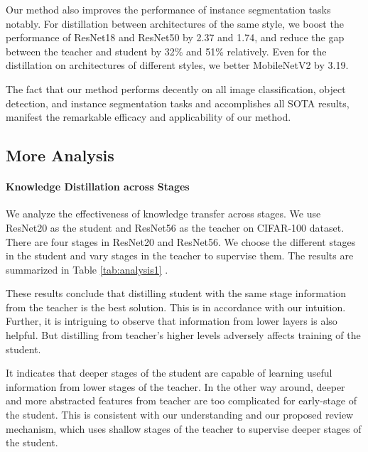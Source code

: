 \documentclass[final]{cvpr}
\begin{document}
Our method also improves the performance of instance segmentation tasks notably. For distillation between architectures of the same style, we boost the performance of ResNet18 and ResNet50 by 2.37 and 1.74, and reduce the gap between the teacher and student by 32\% and 51\% relatively. Even for the distillation on architectures of different styles, we better MobileNetV2 by 3.19. 

The fact that our method performs decently on all image classification, object detection, and instance segmentation tasks and accomplishes all SOTA results, manifest the remarkable efficacy and applicability of our method.


\subsection{More Analysis}

\paragraph{Knowledge Distillation across Stages}
\label{sec:analysis}
We analyze the effectiveness of knowledge transfer across stages. 
We use ResNet20 as the student and ResNet56 as the teacher on CIFAR-100 dataset. There are four stages in ResNet20 and ResNet56. We choose the different stages in the student and vary stages in the teacher to supervise them. The results are summarized in Table \ref{tab:analysis1} .

These results conclude that distilling student with the same stage information from the teacher is the best solution. This is in accordance with our intuition. Further, it is intriguing to observe that information from lower layers is also helpful. But distilling from teacher's higher levels adversely affects training of the student. 

It indicates that deeper stages of the student are capable of learning useful information from lower stages of the teacher. In the other way around, deeper and more abstracted features from teacher are too complicated for early-stage of the student. This is consistent with our understanding and our proposed review mechanism, which uses shallow stages of the teacher to supervise deeper stages of the student.
\end{document}

